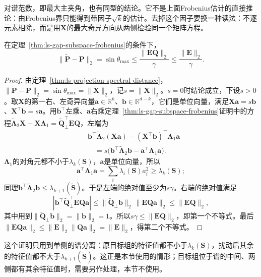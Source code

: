 对谱范数，即最大主夹角，也有同型的结论。它不是上面Frobenius估计的直接推论：由Frobenius界只能得到带因子$\sqrt k$的估计。去掉这个因子要换一种读法：不逐元素相除，而是用$\bm X$的最大奇异方向从两侧检验同一个矩阵方程。
\begin{theorem}
\label{thm:ls-davis-kahan}
在定理~\ref{thm:ls-gap-subspace-frobenius}的条件下，
\begin{equation}
 \lVert\widetilde{\bm P}-\bm P\rVert_2=\sin\theta_{\max}
 \leq\frac{\lVert\bm E\bm Q\rVert_2}{\gamma}\leq\frac{\lVert\bm E\rVert_2}{\gamma}.
 \label{eq:matrix-analysis-eigenvector-gap-bound}
\end{equation}
\end{theorem}
\begin{proof}
由定理~\ref{thm:ls-projection-spectral-distance}，$\lVert\widetilde{\bm P}-\bm P\rVert_2=\sin\theta_{\max}=\lVert\bm X\rVert_2$，记$s=\lVert\bm X\rVert_2$。$s=0$时结论成立，下设$s>0$。取$\bm X$的第一右、左奇异向量$\bm a\in\mathbb R^k$、$\bm b\in\mathbb R^{d-k}$，它们是单位向量，满足$\bm X\bm a=s\bm b$、$\bm X^\top\bm b=s\bm a$。用$\bm b^\top$左乘、$\bm a$右乘定理~\ref{thm:ls-gap-subspace-frobenius}证明中的方程$\widetilde{\bm\Lambda}_2\bm X-\bm X\bm\Lambda_1=\widetilde{\bm Q}_\perp^\top\bm E\bm Q$，左端为
\[
 \begin{aligned}
 &\bm b^\top\widetilde{\bm\Lambda}_2(\bm X\bm a)-(\bm X^\top\bm b)^\top\bm\Lambda_1\bm a\\
 &\quad=s\bigl(\bm b^\top\widetilde{\bm\Lambda}_2\bm b-\bm a^\top\bm\Lambda_1\bm a\bigr).
 \end{aligned}
\]
$\bm\Lambda_1$的对角元都不小于$\lambda_k(\bm S)$，$\bm a$是单位向量，所以
\[
 \bm a^\top\bm\Lambda_1\bm a=\sum_i\lambda_i(\bm S)a_i^2\geq\lambda_k(\bm S);
\]
同理$\bm b^\top\widetilde{\bm\Lambda}_2\bm b\leq\lambda_{k+1}(\widetilde{\bm S})$。于是左端的绝对值至少为$s\gamma$。右端的绝对值满足
\[
 |\bm b^\top\widetilde{\bm Q}_\perp^\top\bm E\bm Q\bm a|
 \leq\lVert\widetilde{\bm Q}_\perp\bm b\rVert_2\,\lVert\bm E\bm Q\bm a\rVert_2
 \leq\lVert\bm E\bm Q\rVert_2 ,
\]
其中用到$\lVert\widetilde{\bm Q}_\perp\bm b\rVert_2=\lVert\bm b\rVert_2=1$。所以$s\gamma\leq\lVert\bm E\bm Q\rVert_2$，即第一个不等式。最后$\lVert\bm E\bm Q\bm a\rVert_2\leq\lVert\bm E\rVert_2\lVert\bm Q\bm a\rVert_2=\lVert\bm E\rVert_2$，得第二个不等式。
\end{proof}
这个证明只用到单侧的谱分离：原目标组的特征值都不小于$\lambda_k(\bm S)$，扰动后其余的特征值都不大于$\lambda_{k+1}(\widetilde{\bm S})$。这正是本节使用的情形；目标组位于谱的中间、两侧都有其余特征值时，需要另作处理，本节不使用。

